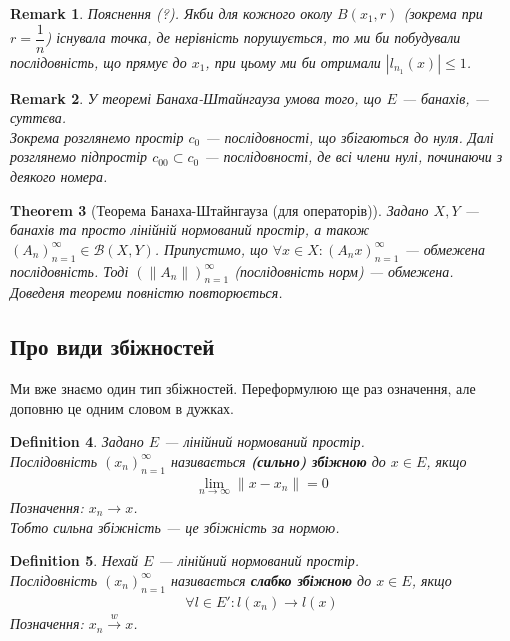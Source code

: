 \documentclass[a4paper, 10pt]{article}
\theoremstyle{theoremdd}
\newtheorem{theorem}{Theorem}[subsection]
\theoremstyle{theoremdd}
\newtheorem{definition}[theorem]{Definition}
\theoremstyle{theoremdd}
\theoremstyle{theoremdd}
\theoremstyle{theoremdd}
\theoremstyle{theoremdd}
\newtheorem{remark}[theorem]{Remark}
\theoremstyle{theoremdd}
\theoremstyle{theoremdd}
\newcommand{\toweak}{\overset{w}{\to}}
\begin{document}
\begin{remark}
Пояснення (?). Якби для кожного околу $B(x_1,r)$ (зокрема при $r = \dfrac{1}{n}$) існувала точка, де нерівність порушується, то ми би побудували послідовність, що прямує до $x_1$, при цьому ми би отримали $|l_{n_1}(x)| \leq 1$.
\end{remark}

\begin{remark}
У теоремі Банаха-Штайнгауза умова того, що $E$ --- банахів, --- суттєва.\\
Зокрема розглянемо простір $c_0$ --- послідовності, що збігаються до нуля. Далі розглянемо підпростір $c_{00} \subset c_0$ --- послідовності, де всі члени нулі, починаючи з деякого номера.
\end{remark}

\begin{theorem}[Теорема Банаха-Штайнгауза (для операторів)]
Задано $X,Y$ --- банахів та просто лінійній нормований простір, а також $(A_n)_{n=1}^\infty \in \mathcal{B}(X,Y)$. Припустимо, що $\forall x \in X: (A_n x)_{n=1}^\infty$ --- обмежена послідовність. Тоді $(\|A_n\|)_{n=1}^\infty$ (послідовність норм) --- обмежена.\\
\textit{Доведеня теореми повністю повторюється.}
\end{theorem}
\fi

\subsection{Про види збіжностей}
Ми вже знаємо один тип збіжностей. Переформулюю ще раз означення, але доповню це одним словом в дужках.
\begin{definition}
Задано $E$ --- лінійний нормований простір.\\
Послідовність $(x_n)_{n=1}^\infty$ називається \textbf{(сильно) збіжною} до $x \in E$, якщо
\begin{align*}
\lim_{n \to \infty} \|x - x_n\| = 0
\end{align*}
Позначення: $x_n \to x$.\\
Тобто сильна збіжність --- це збіжність за нормою.
\end{definition}

\begin{definition}
Нехай $E$ --- лінійний нормований простір.\\
Послідовність $(x_n)_{n=1}^\infty$ називається \textbf{слабко збіжною} до $x \in E$, якщо
\begin{align*}
\forall l \in E': l(x_n) \to l(x)
\end{align*}
Позначення: $x_n \toweak x$.
\end{definition}
\noindent
\end{document}
